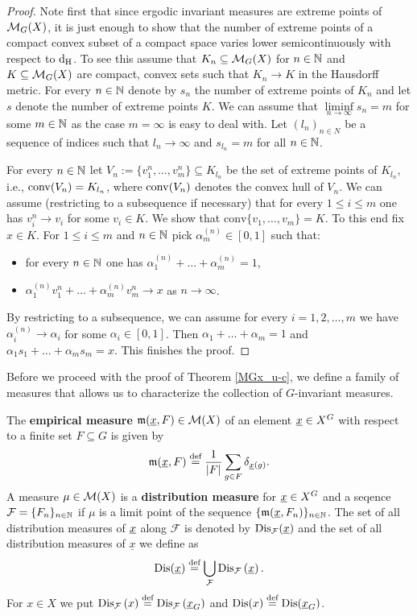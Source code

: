 \begin{proof}
Note first that since ergodic invariant measures are extreme points of $\operatorname{\mathcal{M}}_G(X)$, it is just enough to show that the number of extreme points of a compact convex subset of a compact space varies lower semicontinuously with respect to $\operatorname{d_H}$. To see this assume that $K_n\subseteq \operatorname{\mathcal{M}}_G(X)$ for $n\in\mathbb{N}$ and $K\subseteq \operatorname{\mathcal{M}}_G(X)$ are compact, convex sets such that $K_n \to K$ in the Hausdorff metric.
%
For every $n\in\mathbb{N}$ denote by $s_n$ the number of extreme points of $K_n$ and let $s$ denote the number of extreme points $K$.
%
We can assume that $\liminf\limits_{n\to\infty}s_n=m$ for some $m\in\mathbb{N}$ as the case $m=\infty$ is easy to deal with.
%
Let $(l_n)_{n\in N}$ be a sequence of indices such that $l_n \to \infty$ and $s_{l_n}=m$ for all $n\in \mathbb{N}$.

For every $n\in\mathbb{N}$ let $V_n:=\{v_1^n,\ldots, v_m^n\}\subseteq K_{l_n}$ be the set of extreme points of $K_{l_n}$, i.e.,  $\operatorname{conv}(V_n)=K_{l_n}$, where $\operatorname{conv}(V_n)$ denotes the convex hull of $V_n$.
%
We can assume (restricting to a subsequence if necessary) that for every $1\leq i\leq m$ one has $v_i^n\to v_i$ for some $v_i\in K$. We show that $\text{conv}\{v_1,\ldots, v_m\}=K$. To this end fix $x\in K$. For $1\leq i\leq m$ and $n\in\mathbb{N}$ pick $\alpha^{(n)}_m\in[0,1]$ such that:
\begin{itemize}
\item for every $n\in\mathbb{N}$ one has $\alpha_1^{(n)}+\ldots+\alpha_m^{(n)}=1$,
\item $\alpha_1^{(n)}v_1^{n}+\ldots+\alpha_m^{(n)}v_m^{n}\to x$ as $n\to\infty$.
\end{itemize}
By restricting to a subsequence, we can assume for every $i=1,2,\ldots,m$ we have $\alpha_i^{(n)}\to\alpha_i$ for some $\alpha_i\in[0,1]$. Then
$\alpha_1+\ldots+\alpha_m=1$ and $\alpha_1s_1+\ldots+\alpha_ms_m=x$.
This finishes the proof.
\end{proof}
\noindent 
Before we proceed with the proof of Theorem \ref{MGx_u-c}, we define a family of measures
 that allows us to characterize the collection of $G$-invariant measures.
\begin{defn}
The {\bf empirical measure} $\operatorname{\mathfrak m}(\underline{x}, F)\in\operatorname{\mathcal{M}}(X)$ of an element $\underline{x}\in X^G$ with respect to a finite set $F\subseteq G$ is given by
\[
\operatorname{\mathfrak m}(\underline{x}, F)\stackrel{\textup{def}}{=}\frac{1}{|F|}\sum_{g\in F} {\delta}_{\underline{x}(g)}.
\]
A measure $\mu\in \operatorname{\mathcal{M}}(X)$ is a {\bf distribution measure} for $\underline{x}\in X^G$ and a \Folner seqence $\operatorname{\mathcal{F}}=\{F_n\}_{n\in\mathbb{N}}$ if $\mu$ is a limit point of the sequence
$\{\operatorname{\mathfrak m}(\underline{x},F_n)\}_{n\in\mathbb{N}}$. The set of all distribution measures of $\underline{x}$ along $\mathcal F$ is denoted by $\operatorname{Dis}_{\operatorname{\mathcal{F}}}({\underline{x}})$ and the set of all distribution measures of $\underline{x}$ we define as
\[
\operatorname{Dis}(\underline{x})\stackrel{\textup{def}}{=}\bigcup_{\mathcal F}\operatorname{Dis}_{\operatorname{\mathcal{F}}}\left(\underline{x}\right).
\]
For $x\in X$ we put $\operatorname{Dis}_{\operatorname{\mathcal{F}}}\left(x\right)\stackrel{\textup{def}}{=}\operatorname{Dis}_{\operatorname{\mathcal{F}}}\left(\underline{x}_G\right)$ and $\operatorname{Dis}(x)\stackrel{\textup{def}}{=}\operatorname{Dis}(\underline{x}_G)$.
\end{defn}
